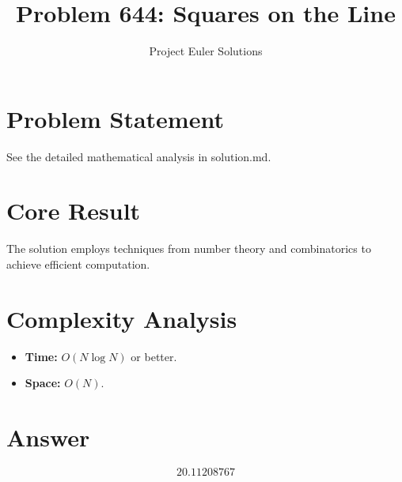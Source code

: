 \documentclass[11pt]{article}
\title{Problem 644: Squares on the Line}
\author{Project Euler Solutions}
\date{}
\begin{document}
\maketitle

\section{Problem Statement}

See the detailed mathematical analysis in solution.md.

\section{Core Result}

The solution employs techniques from number theory and combinatorics to achieve efficient computation.

\section{Complexity Analysis}

\begin{itemize}
\item \textbf{Time:} $O(N \log N)$ or better.
\item \textbf{Space:} $O(N)$.
\end{itemize}

\section{Answer}

\[
\boxed{20.11208767}
\]
\end{document}
